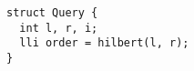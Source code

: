 \begin{lstlisting}
struct Query {
  int l, r, i;
  lli order = hilbert(l, r);
}
\end{lstlisting}

\vspace{5pt}